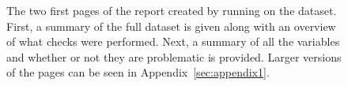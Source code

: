 \documentclass[article,shortnames]{jss}
\begin{document}
\begin{figure}[tb]
\begin{center}
%
\end{center}
\caption{The two first pages of the report created by running  on the 
  dataset. First, a summary of the full dataset is given along with an overview of what checks were performed. Next, a summary of all the variables and whether or not they are problematic is provided. Larger versions of the pages can be seen in
  Appendix~\ref{sec:appendix1}.}
\label{fig:example1}
\end{figure}
\end{document}

